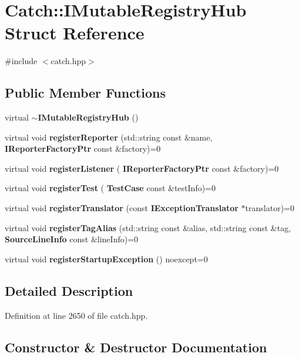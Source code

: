 \section{Catch\+::I\+Mutable\+Registry\+Hub Struct Reference}
\label{struct_catch_1_1_i_mutable_registry_hub}


{\ttfamily \#include $<$catch.\+hpp$>$}

\subsection*{Public Member Functions}
\begin{DoxyCompactItemize}
\item 
virtual \textbf{ $\sim$\+I\+Mutable\+Registry\+Hub} ()
\item 
virtual void \textbf{ register\+Reporter} (std\+::string const \&name, \textbf{ I\+Reporter\+Factory\+Ptr} const \&factory)=0
\item 
virtual void \textbf{ register\+Listener} (\textbf{ I\+Reporter\+Factory\+Ptr} const \&factory)=0
\item 
virtual void \textbf{ register\+Test} (\textbf{ Test\+Case} const \&test\+Info)=0
\item 
virtual void \textbf{ register\+Translator} (const \textbf{ I\+Exception\+Translator} $\ast$translator)=0
\item 
virtual void \textbf{ register\+Tag\+Alias} (std\+::string const \&alias, std\+::string const \&tag, \textbf{ Source\+Line\+Info} const \&line\+Info)=0
\item 
virtual void \textbf{ register\+Startup\+Exception} () noexcept=0
\end{DoxyCompactItemize}


\subsection{Detailed Description}


Definition at line 2650 of file catch.\+hpp.



\subsection{Constructor \& Destructor Documentation}
\mbox{\label{struct_catch_1_1_i_mutable_registry_hub_a759ca1e044e19f905fb4d306f1367193}} 
